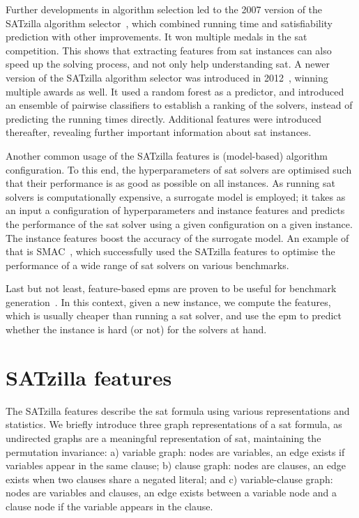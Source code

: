 Further developments in algorithm selection led to the 2007 version of the SATzilla algorithm selector~\cite{XuEtAl08}, which combined running time and satisfiability prediction with other improvements. It won multiple medals in the \gls{sat} competition. This shows that extracting features from \gls{sat} instances can also speed up the solving process, and not only help understanding \gls{sat}. A newer version of the SATzilla algorithm selector was introduced in 2012~\cite{XuEtAl12}, winning multiple awards as well. It used a random forest as a predictor, and introduced an ensemble of pairwise classifiers to establish a ranking of the solvers, instead of predicting the running times directly. Additional features were introduced thereafter, revealing further important information about \gls{sat} instances. 


Another common usage of the SATzilla features is (model-based) algorithm configuration. To this end, the hyperparameters of \gls{sat} solvers are optimised such that their performance is as good as possible on all instances. As running \gls{sat} solvers is computationally expensive, a surrogate model is employed; it takes as an input a configuration of hyperparameters and instance features and predicts the performance of the \gls{sat} solver using a given configuration on a given instance. The instance features boost the accuracy of the surrogate model. An example of that is SMAC~\cite{HutEtAl11}, which successfully used the SATzilla features to optimise the performance of a wide range of \gls{sat} solvers on various benchmarks.


Last but not least, feature-based \glspl{epm} are proven to be useful for benchmark generation~\cite{LeyEtAl09}. In this context, given a new instance, we compute the features, which is usually cheaper than running a \gls{sat} solver, and use the \gls{epm} to predict whether the instance is hard (or not) for the solvers at hand.


\section{SATzilla features}
\label{sec:ch03:SATzilla-features}


The SATzilla features describe the \gls{sat} formula using various representations and statistics. We briefly introduce three graph representations of a \gls{sat} formula, as undirected graphs are a meaningful representation of \gls{sat}, maintaining the permutation invariance: a) variable graph: nodes are variables, an edge exists if variables appear in the same clause; b) clause graph: nodes are clauses, an edge exists when two clauses share a negated literal; and c) variable-clause graph: nodes are variables and clauses, an edge exists between a variable node and a clause node if the variable appears in the clause.


